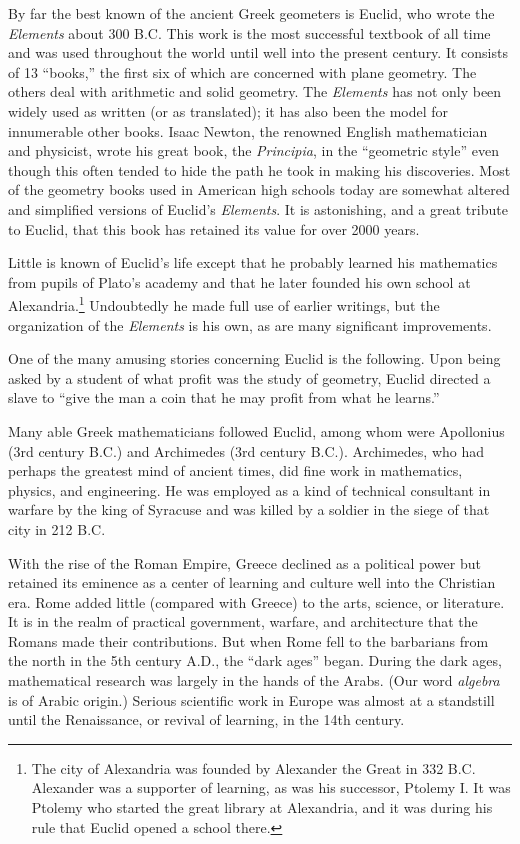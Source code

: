 \documentclass[11pt]{book}
\theoremstyle{bkplain}
\theoremstyle{XIplainnote}
\theoremstyle{bkplain}
\theoremstyle{bkplain}
\begin{document}
By far the best known of the ancient Greek geometers is Euclid, who wrote the
\emph{Elements} about 300 B.C. This work is the most successful textbook of all
time and was used throughout the world until well into the present century. It
consists of 13 ``books,'' the first six of which are concerned with plane
geometry. The others deal with arithmetic and solid geometry. The
\emph{Elements} has not only been widely used as written (or as translated); it
has also been the model for innumerable other books. Isaac Newton, the renowned
English mathematician and physicist, wrote his great book, the \emph{Principia},
in the ``geometric style'' even though this often tended to hide the path he took
in making his discoveries. Most of the geometry books used in American high
schools today are somewhat altered and simplified versions of Euclid's
\emph{Elements}. It is astonishing, and a great tribute to Euclid, that this
book has retained its value for over 2000 years.

Little is known of Euclid's life except that he probably learned his mathematics
from pupils of Plato's academy and that he later founded his own school at
Alexandria.\footnote{The city of Alexandria was founded by Alexander the Great in
332 B.C. Alexander was a supporter of learning, as was his successor, Ptolemy I.
It was Ptolemy who started the great library at Alexandria, and it was during his
rule that Euclid opened a school there.}
Undoubtedly he made full use of earlier writings, but the organization of the
\emph{Elements} is his own, as are many significant improvements.

One of the many amusing stories concerning Euclid is the following. Upon being
asked by a student of what profit was the study of geometry, Euclid directed a
slave to ``give the man a coin that he may profit from what he learns.''

\setcounter{footnote}{0}
Many able Greek mathematicians followed Euclid, among whom were Apollonius (3rd
century B.C.) and Archimedes (3rd century B.C.). Archimedes, who had perhaps the
greatest mind of ancient times, did fine work in mathematics, physics, and
engineering. He was employed as a kind of technical consultant in warfare by the
king of Syracuse and was killed by a soldier in the siege of that city in 212
B.C.

With the rise of the Roman Empire, Greece declined as a political power but
retained its eminence as a center of learning and culture well into the Christian
era. Rome added little (compared with Greece) to the arts, science, or
literature. It is in the realm of practical government, warfare, and architecture
that the Romans made their contributions. But when Rome fell to the barbarians
from the north in the 5th century A.D., the ``dark ages'' began. During the dark
ages, mathematical research was largely in the hands of the Arabs. (Our word
\emph{algebra} is of Arabic origin.) Serious scientific work in Europe was almost
at a standstill until the Renaissance, or revival of learning, in the 14th
century.
\end{document}
